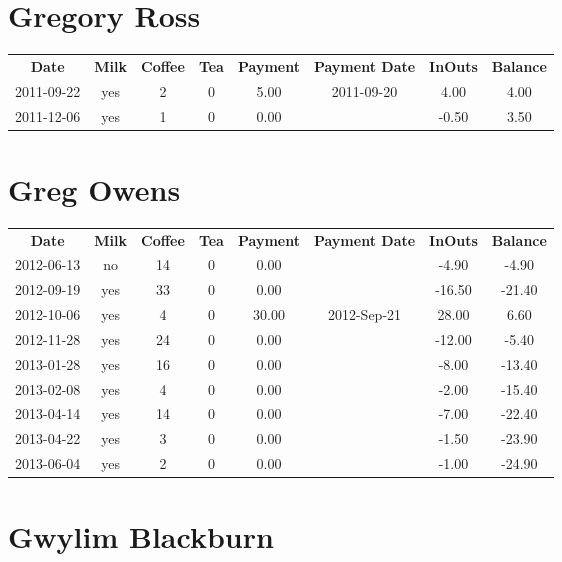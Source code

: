 \section{Gregory Ross}

\begin{center}
\begin{tabular}{cccccccc}
\textbf{Date} & \textbf{Milk} & \textbf{Coffee} & \textbf{Tea} & \textbf{Payment} & \textbf{Payment Date} & \textbf{InOuts} & \textbf{Balance} \\
2011-09-22 & yes & 2 & 0 & 5.00 & 2011-09-20 &  4.00 & 4.00\\ 
2011-12-06 & yes & 1 & 0 & 0.00 &  & -0.50 & 3.50
\end{tabular}
\end{center}

\section{Greg Owens}

\begin{center}
\begin{tabular}{cccccccc}
\textbf{Date} & \textbf{Milk} & \textbf{Coffee} & \textbf{Tea} & \textbf{Payment} & \textbf{Payment Date} & \textbf{InOuts} & \textbf{Balance} \\
2012-06-13 & no & 14 & 0 &  0.00 &  &  -4.90 &  -4.90\\ 
2012-09-19 & yes & 33 & 0 &  0.00 &  & -16.50 & -21.40\\ 
2012-10-06 & yes &  4 & 0 & 30.00 & 2012-Sep-21 &  28.00 &   6.60\\ 
2012-11-28 & yes & 24 & 0 &  0.00 &  & -12.00 &  -5.40\\ 
2013-01-28 & yes & 16 & 0 &  0.00 &  &  -8.00 & -13.40\\ 
2013-02-08 & yes &  4 & 0 &  0.00 &  &  -2.00 & -15.40\\ 
2013-04-14 & yes & 14 & 0 &  0.00 &  &  -7.00 & -22.40\\ 
2013-04-22 & yes &  3 & 0 &  0.00 &  &  -1.50 & -23.90\\ 
2013-06-04 & yes &  2 & 0 &  0.00 &  &  -1.00 & -24.90
\end{tabular}
\end{center}

\section{Gwylim Blackburn}

